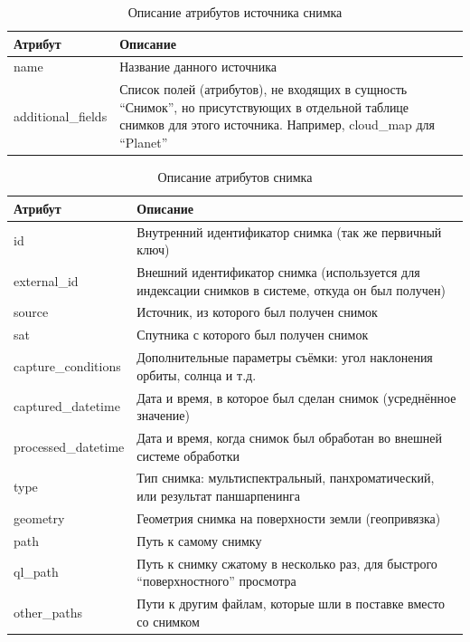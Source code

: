 \documentclass[a4paper]{article}
\begin{document}
\begin{table}[h]
	\begin{tabular}{|C{0.20\textwidth}|p{0.75\textwidth}|}
		\hline
		Атрибут & \centering\arraybackslash Описание \\
		\hline
		name & Название данного источника \\
		\hline
		additional\_fields & Список полей (атрибутов), не входящих в сущность ``Снимок'', но присутствующих в отдельной таблице снимков для этого источника. Например, cloud\_map для ``Planet'' \\
		\hline
	\end{tabular}
	\caption{Описание атрибутов источника снимка}
\end{table}

\begin{table}[h]
	\begin{tabular}{|C{0.20\textwidth}|p{0.75\textwidth}|}
		\hline
		Атрибут & \centering\arraybackslash Описание \\
		\hline
		id & Внутренний идентификатор снимка (так же первичный ключ) \\
		\hline
		external\_id &  Внешний идентификатор снимка (используется для индексации снимков в системе, откуда он был получен) \\
		\hline
		source & Источник, из которого был получен снимок \\
		\hline
		sat & Спутника с которого был получен снимок \\
		\hline
		capture\_conditions & Дополнительные параметры съёмки: угол наклонения орбиты, солнца и т.д. \\
		\hline
		captured\_datetime & Дата и время, в которое был сделан снимок (усреднённое значение) \\
		\hline
		processed\_datetime & Дата и время, когда снимок был обработан во внешней системе обработки \\
		\hline
		type & Тип снимка: мультиспектральный, панхроматический, или результат паншарпенинга \\
		\hline
		geometry & Геометрия снимка на поверхности земли (геопривязка) \\
		\hline
		path & Путь к самому снимку \\
		\hline
		ql\_path & Путь к снимку сжатому в несколько раз, для быстрого ``поверхностного'' просмотра \\
		\hline
		other\_paths & Пути к другим файлам, которые шли в поставке вместо со снимком \\
		\hline
	\end{tabular}
	\caption{Описание атрибутов снимка}
\end{table}
\end{document}

